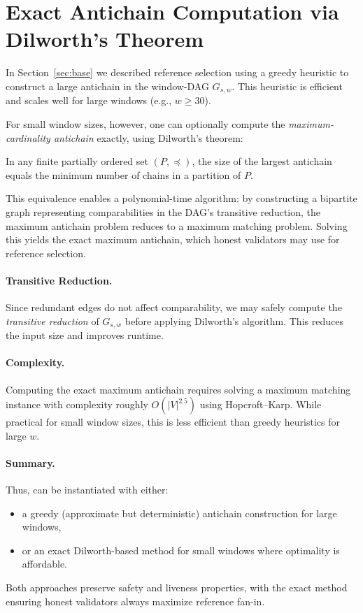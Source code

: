 \appendix
\section{Exact Antichain Computation via Dilworth's Theorem}
\label{sec:appendix-dilworth}

In Section~\ref{sec:base} we described reference selection using a greedy heuristic to construct a large antichain in the window-DAG $G_{s,w}$. This heuristic is efficient and scales well for large windows (e.g., $w \ge 30$). 

For small window sizes, however, one can optionally compute the \emph{maximum-cardinality antichain} exactly, using Dilworth's theorem:

\begin{theorem}[Dilworth, 1950]
In any finite partially ordered set $(P,\preceq)$, the size of the largest antichain equals the minimum number of chains in a partition of $P$.
\end{theorem}

This equivalence enables a polynomial-time algorithm: by constructing a bipartite graph representing comparabilities in the DAG's transitive reduction, the maximum antichain problem reduces to a maximum matching problem. Solving this yields the exact maximum antichain, which honest validators may use for reference selection.

\paragraph{Transitive Reduction.}
Since redundant edges do not affect comparability, we may safely compute the \emph{transitive reduction} of $G_{s,w}$ before applying Dilworth’s algorithm. This reduces the input size and improves runtime.

\paragraph{Complexity.}
Computing the exact maximum antichain requires solving a maximum matching instance with complexity roughly $O(|V|^{2.5})$ using Hopcroft–Karp. While practical for small window sizes, this is less efficient than greedy heuristics for large $w$.

\paragraph{Summary.}
Thus, \Proj can be instantiated with either:
\begin{itemize}
  \item a greedy (approximate but deterministic) antichain construction for large windows,
  \item or an exact Dilworth-based method for small windows where optimality is affordable.
\end{itemize}
Both approaches preserve safety and liveness properties, with the exact method ensuring honest validators always maximize reference fan-in.

